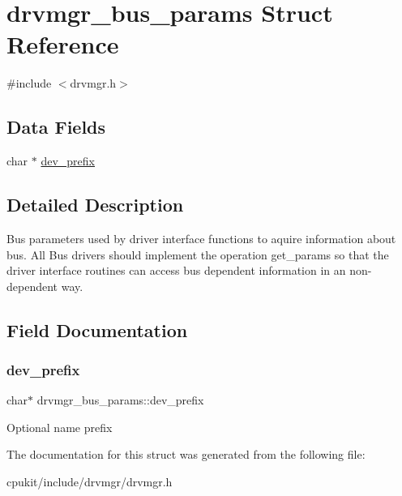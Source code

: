 \hypertarget{structdrvmgr__bus__params}{}\section{drvmgr\+\_\+bus\+\_\+params Struct Reference}
\label{structdrvmgr__bus__params}


{\ttfamily \#include $<$drvmgr.\+h$>$}

\subsection*{Data Fields}
\begin{DoxyCompactItemize}
\item 
char $\ast$ \mbox{\hyperlink{structdrvmgr__bus__params_ac57187503d68435f7601875716b9f1d5}{dev\+\_\+prefix}}
\end{DoxyCompactItemize}


\subsection{Detailed Description}
Bus parameters used by driver interface functions to aquire information about bus. All Bus drivers should implement the operation \textquotesingle{}get\+\_\+params\textquotesingle{} so that the driver interface routines can access bus dependent information in an non-\/dependent way. 

\subsection{Field Documentation}
\mbox{\label{structdrvmgr__bus__params_ac57187503d68435f7601875716b9f1d5}} 
\subsubsection{\texorpdfstring{dev\_prefix}{dev\_prefix}}
{\footnotesize\ttfamily char$\ast$ drvmgr\+\_\+bus\+\_\+params\+::dev\+\_\+prefix}

Optional name prefix 

The documentation for this struct was generated from the following file\+:\begin{DoxyCompactItemize}
\item 
cpukit/include/drvmgr/drvmgr.\+h\end{DoxyCompactItemize}
